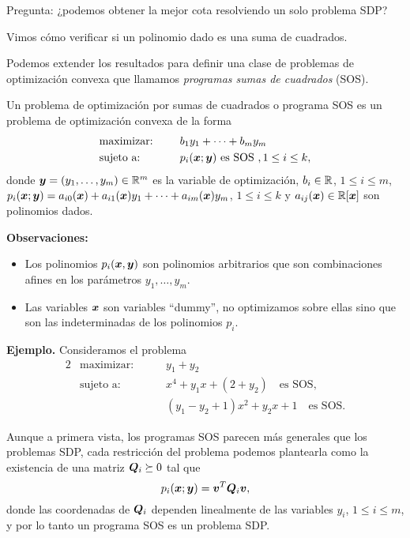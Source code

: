 Pregunta: ¿podemos obtener la mejor cota resolviendo un solo problema SDP?


Vimos cómo verificar si un polinomio dado es una suma de cuadrados.

Podemos extender los resultados para definir una clase de problemas de optimización convexa que llamamos \emph{programas sumas de cuadrados} (SOS).

\begin{definition}
Un problema de optimización por sumas de cuadrados o programa SOS es un problema de optimización convexa de la forma
\begin{alignat*}{2}
  & \text{maximizar: } & & b_1 y_1 + \dots + b_m y_m  \\
   & \text{sujeto a: } & \quad & p_i(\bm{x}; \bm{y}) \text{ es SOS }, 1 \le i \le k,
\end{alignat*}
donde $\bm{y} = (y_1, \dots, y_m) \in \mathbb{R}^m$ es la variable de optimización, $b_i \in \mathbb{R}$, $1 \le i \le m$, $p_i(\bm{x}; \bm{y}) = a_{i0}(\bm{x}) + a_{i1}(\bm{x}) y_1 + \dots + a_{im}(\bm{x}) y_m$, $1 \le i \le k$ y $a_{ij}(\bm{x}) \in \mathbb{R}[\bm{x}]$ son polinomios dados.
\end{definition}

\textbf{Observaciones:}
\begin{itemize}
\item Los polinomios $p_i(\bm{x}, \bm{y})$ son polinomios arbitrarios que son combinaciones afines en los parámetros $y_1, \dots, y_m$.
\item Las variables $\bm{x}$ son variables ``dummy'', no optimizamos sobre ellas sino que son las indeterminadas de los polinomios $p_i$.
\end{itemize}

\textbf{Ejemplo.}
Consideramos el problema
\begin{alignat*}{2}
  & \text{maximizar: } & & y_1 + y_2  \\
  & \text{sujeto a: } & \quad & x^4 + y_1 x + (2 + y_2) \quad \text{es SOS,} \\
  &  & \quad & (y_1 - y_2 + 1)x^2 + y_2 x + 1 \quad  \text{es SOS.}
\end{alignat*}


Aunque a primera vista, los programas SOS parecen más generales que los problemas SDP, cada restricción del problema podemos plantearla como la existencia de una matriz $\bm{Q}_i \succeq 0$ tal que
$$
p_i(\bm{x}; \bm{y}) = \bm{v}^T \bm{Q}_i \bm{v},
$$
donde las coordenadas de $\bm{Q}_i$ dependen linealmente de las variables $y_i$, $1 \le i \le m$, y por lo tanto un programa SOS es un problema SDP.


